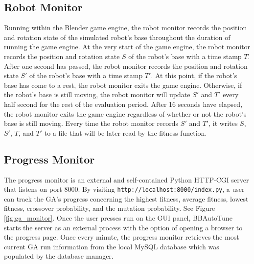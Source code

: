 \subsection{Robot Monitor}

Running within the Blender game engine, the robot monitor records the position and rotation state of the simulated robot's base throughout the duration of running the game engine. At the very start of the game engine, the robot monitor records the position and rotation state $S$ of the robot's base with a time stamp $T$. After one second has passed, the robot monitor records the position and rotation state $S'$ of the robot's base with a time stamp $T'$. At this point, if the robot's base has come to a rest, the robot monitor exits the game engine. Otherwise, if the robot's base is still moving, the robot monitor will update $S'$ and $T'$ every half second for the rest of the evaluation period. After 16 seconds have elapsed, the robot monitor exits the game engine regardless of whether or not the robot's base is still moving. Every time the robot monitor records $S'$ and $T'$, it writes $S$, $S'$, $T$, and $T'$ to a file that will be later read by the fitness function.  

\subsection{Progress Monitor}

The progress monitor is an external and self-contained Python HTTP-CGI server that listens on port 8000. By visiting  \texttt{http://localhost:8000/index.py}, a user can track the GA's progress concerning the highest fitness, average fitness, lowest fitness, crossover probability, and the mutation probability. See Figure \ref{fig:ga_monitor}. Once the user presses run on the GUI panel, BBAutoTune starts the server as an external process with the option of opening a browser to the progress page. Once every minute, the progress monitor retrieves the most current GA run information from the local MySQL database which was populated by the database manager.

